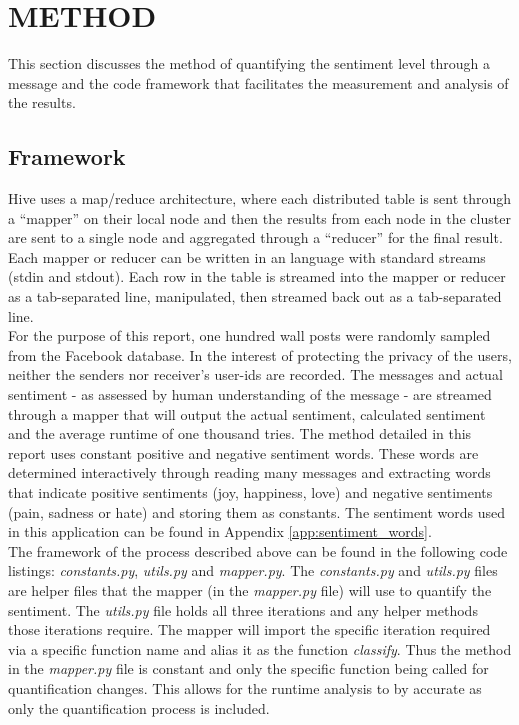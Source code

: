 \section{METHOD} %
\label{sec:method}
This section discusses the method of quantifying the sentiment level through a message and the code framework that facilitates the measurement and analysis of the results.

\subsection{Framework} %
\label{sub:framework}
Hive uses a map/reduce architecture, where each distributed table is sent through a ``mapper'' on their local node and then the results from each node in the cluster are sent to a single node and aggregated through a ``reducer'' for the final result.  Each mapper or reducer can be written in an language with standard streams (stdin and stdout). Each row in the table is streamed into the mapper or reducer as a tab-separated line, manipulated, then streamed back out as a tab-separated line.\\

For the purpose of this report, one hundred wall posts were randomly sampled from the Facebook database.  In the interest of protecting the privacy of the users, neither the senders nor receiver's user-ids are recorded.  The messages and actual sentiment - as assessed by human understanding of the message - are streamed through a mapper that will output the actual sentiment, calculated sentiment and the average runtime of one thousand tries. The method detailed in this report uses constant positive and negative sentiment words.  These words are determined interactively through reading many messages and extracting words that indicate positive sentiments (joy, happiness, love) and negative sentiments (pain, sadness or hate) and storing them as constants. The sentiment words used in this application can be found in Appendix \ref{app:sentiment_words}.\\

The framework of the process described above can be found in the following code listings: \emph{constants.py}, \emph{utils.py} and \emph{mapper.py}. The \emph{constants.py} and \emph{utils.py} files are helper files that the mapper (in the \emph{mapper.py} file) will use to quantify the sentiment.  The \emph{utils.py} file holds all three iterations and any helper methods those iterations require.  The mapper will import the specific iteration required via a specific function name and alias it as the function \emph{classify}. Thus the method in the \emph{mapper.py} file is constant and only the specific function being called for quantification changes.  This allows for the runtime analysis to by accurate as only the quantification process is included.

